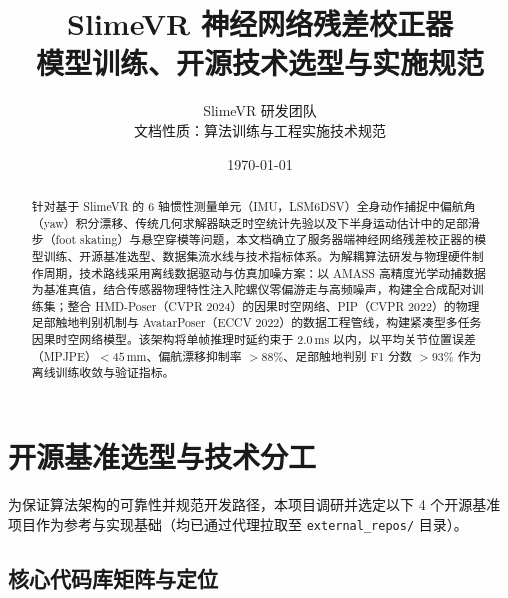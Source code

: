 \documentclass[UTF8,11pt,a4paper]{ctexart}
\title{\LARGE\bfseries SlimeVR 神经网络残差校正器\\模型训练、开源技术选型与实施规范}
\author{%
    SlimeVR 研发团队 \\
    文档性质：算法训练与工程实施技术规范
}
\date{\today}
\begin{document}
\maketitle

\begin{abstract}
针对基于 SlimeVR 的 6 轴惯性测量单元（IMU，LSM6DSV）全身动作捕捉中偏航角（yaw）积分漂移、传统几何求解器缺乏时空统计先验以及下半身运动估计中的足部滑步（foot skating）与悬空穿模等问题，本文档确立了服务器端神经网络残差校正器的模型训练、开源基准选型、数据集流水线与技术指标体系。为解耦算法研发与物理硬件制作周期，技术路线采用离线数据驱动与仿真加噪方案：以 AMASS 高精度光学动捕数据为基准真值，结合传感器物理特性注入陀螺仪零偏游走与高频噪声，构建全合成配对训练集；整合 HMD-Poser（CVPR 2024）的因果时空网络、PIP（CVPR 2022）的物理足部触地判别机制与 AvatarPoser（ECCV 2022）的数据工程管线，构建紧凑型多任务因果时空网络模型。该架构将单帧推理时延约束于 2.0\,ms 以内，以平均关节位置误差（MPJPE）$< 45$\,mm、偏航漂移抑制率 $> 88\%$、足部触地判别 F1 分数 $> 93\%$ 作为离线训练收敛与验证指标。
\end{abstract}

\newpage
\tableofcontents
\newpage

\section{开源基准选型与技术分工}
\label{sec:repos}

为保证算法架构的可靠性并规范开发路径，本项目调研并选定以下 4 个开源基准项目作为参考与实现基础（均已通过代理拉取至 \texttt{external\_repos/} 目录）。

\subsection{核心代码库矩阵与定位}
\end{document}
